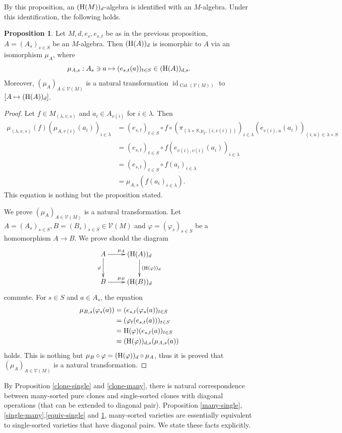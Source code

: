 \documentclass[a4paper,10pt]{article}
\theoremstyle{definition}
\newtheorem{prop}[df]{Proposition}
\newcommand\ph{\varphi}
\newcommand\ra{\rightarrow}
\DeclareMathOperator{\id}{id}
\newcommand\V{\mathcal{V}}
\DeclareMathOperator{\Cat}{Cat}
\begin{document}
By this proposition, an $({\rm H}(M))_d$-algebra is identified with an
$M$-algebra. Under this identification, the following holds.
\begin{prop}\label{equiv-many}
Let $M,d,e_s,e_{s,t}$ be as in the previous proposition,
$A=(A_s)_{s\in S}$ be an $M$-algebra.
Then $({\rm H}(A))_d$ is isomorphic to $A$ via an isomorphism $\mu_A$, where
\[
\mu_{A,s}:A_s\ni a\mapsto (e_{s,t}(a))_{t\in S}\in ({\rm H}(A))_{d,s}.
\]
Moreover, $(\mu_A)_{A\in\V(M)}$ is a natural transformation
$\id_{\Cat(\V(M))}$ to $[A\mapsto ({\rm H}(A))_d]$.
\end{prop}
\begin{proof}
Let $f\in M_{(\lambda,v,s)}$ and $a_i\in A_{v(i)}$ for $i\in\lambda$.
Then
\begin{align*}
\mu_{(\lambda,v,s)}(f)(\mu_{A,v(i)}(a_i))_{i\in\lambda}
&=(e_{s,t})_{t\in S}\circ f\circ (\pi_{(\lambda\times S,p_2,(i,v(i)))})_{i\in\lambda}
(e_{v(i),u}(a_i))_{(i,u)\in\lambda\times S}\\
&=(e_{s,t})_{t\in S}\circ f(e_{v(i),v(i)}(a_i))_{i\in\lambda}\\
&=(e_{s,t})_{t\in S}\circ f(a_i)_{i\in\lambda}\\
&=\mu_{A,s}(f(a_i)_{i\in\lambda}).
\end{align*}
This equation is nothing but the proposition stated.

We prove $(\mu_A)_{A\in\V(M)}$ is a natural transformation.
Let $A=(A_s)_{s\in S},B=(B_s)_{s\in S}\in \V(M)$ and $\ph=(\ph_s)_{s\in S}$
be a homomorphism $A\ra B$.
We prove should the diagram
\[\xymatrix{
A\ar[r]^{\mu_A} \ar[d]_\ph& ({\rm H}(A))_d\ar[d]^{({\rm H}(\ph))_d}\\
B\ar[r]^{\mu_B} & ({\rm H}(B))_d
}\]
commute. For $s\in S$ and $a\in A_s$, the equation
\begin{align*}
\mu_{B,s}(\ph_s(a))
&=(e_{s,t}(\ph_s(a))_{t\in S}\\
&=(\ph_t(e_{s,t}(a)))_{t\in S}\\
&={\rm H}(\ph)(e_{s,t}(a))_{t\in S}\\
&=({\rm H}(\ph))_{d,s}(\mu_{A,s}(a))
\end{align*}
holds.
This is nothing but $\mu_B\circ \ph=({\rm H}(\ph))_d\circ \mu_A$, thus
it is proved that $(\mu_A)_{A\in\V(M)}$ is a natural transformation.
\end{proof}


By Proposition \ref{clone-single} and \ref{clone-many},
there is natural correspondence between many-sorted pure clones
and single-sorted clones with diagonal operations
(that can be extended to diagonal pair).
Proposition \ref{many-single},\ref{single-many},\ref{equiv-single}
and \ref{equiv-many}, many-sorted varieties are essentially equivalent to single-sorted varieties that have diagonal pairs.
We state these facts explicitly.
\end{document}
